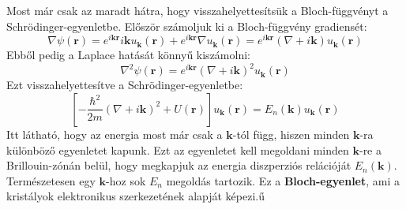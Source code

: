 \documentclass[../main.tex]{subfiles}
\begin{document}
Most már csak az maradt hátra, hogy visszahelyettesítsük a Bloch-függvényt a Schrödinger-egyenletbe. Először számoljuk ki a Bloch-függvény gradiensét:
\begin{equation}
    \nabla \psi(\mathbf{r}) = e^{i \mathbf{k} \mathbf{r}} i \mathbf{k} u_\mathbf{k} (\mathbf{r}) + e^{i \mathbf{k} \mathbf{r}} \nabla u_\mathbf{k} (\mathbf{r}) = e^{i \mathbf{k} \mathbf{r}} (\nabla + i \mathbf{k}) u_\mathbf{k} (\mathbf{r})
\end{equation}
Ebből pedig a Laplace hatását könnyű kiszámolni:
\begin{equation}
    \nabla^2 \psi(\mathbf{r}) = e^{i \mathbf{k} \mathbf{r}} (\nabla + i \mathbf{k})^2 u_\mathbf{k} (\mathbf{r})
\end{equation}
Ezt visszahelyettesítve a Schrödinger-egyenletbe:
\begin{equation}
    \boxed{\left[-\frac{\hbar^2}{2m} (\nabla + i \mathbf{k})^2 + U(\mathbf{r})\right] u_\mathbf{k} (\mathbf{r}) = E_n(\mathbf{k}) u_\mathbf{k} (\mathbf{r})}
\end{equation}
Itt látható, hogy az energia most már csak a $\mathbf{k}$-tól függ, hiszen minden $\mathbf{k}$-ra különböző egyenletet kapunk. Ezt az egyenletet kell megoldani minden $\mathbf{k}$-re a Brillouin-zónán belül, hogy megkapjuk az energia diszperziós relációját $E_n(\mathbf{k})$. 
Természetesen egy $\mathbf{k}$-hoz sok $E_n$ megoldás tartozik. Ez a \textbf{Bloch-egyenlet}, ami a kristályok elektronikus szerkezetének alapját képezi.ű
\end{document}
